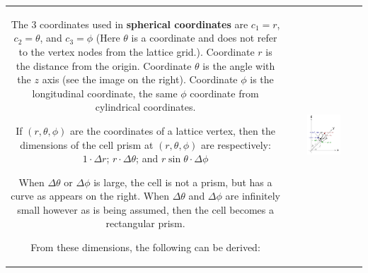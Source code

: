 \documentclass{book}
\begin{document}
\begin{tabular}{cc}
\parbox{0.5\textwidth}{
The 3 coordinates used in {\bf spherical coordinates} are \(c_1 = r\), \(c_2 = \theta\), and \(c_3 = \phi\) (Here \(\theta\) is a coordinate and does not refer to the vertex nodes from the lattice grid.). Coordinate \(r\) is the distance from the origin. Coordinate \(\theta\) is the angle with the \(z\) axis (see the image on the right). Coordinate \(\phi\) is the longitudinal coordinate, the same \(\phi\) coordinate from cylindrical coordinates.

If \((r, \theta, \phi)\) are the coordinates of a lattice vertex, then the dimensions of the cell prism at \((r,\theta,\phi)\) are respectively:
\(1 \cdot \Delta r\); \(r \cdot \Delta\theta\); and \(r\sin\theta \cdot \Delta\phi\)

When \(\Delta\theta\) or \(\Delta\phi\) is large, the cell is not a prism, but has a curve as appears on the right. When \(\Delta\theta\) and \(\Delta\phi\) are infinitely small however as is being assumed, then the cell becomes a rectangular prism.

From these dimensions, the following can be derived:
} & \parbox{0.5\textwidth}{
\includegraphics[width = 0.5\textwidth]{Coordinate_systems/spherical_coordinates}
}
\end{tabular}
\end{document}
